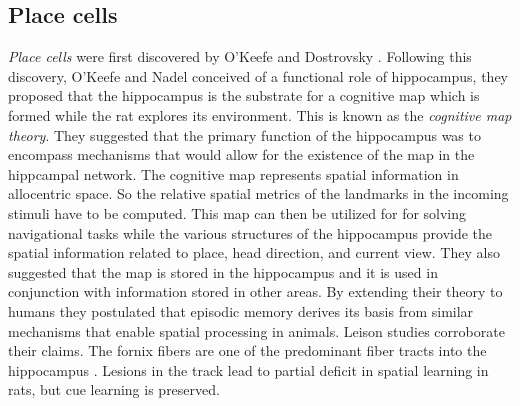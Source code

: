 \subsection{Place cells}
\label{placeCells}
 \emph{Place cells} were first discovered by O'Keefe and Dostrovsky \cite{O'Keefe1971a}. Following this discovery, O'Keefe and Nadel \cite{Street}  conceived of a functional role of hippocampus, they proposed that the hippocampus is the substrate for a cognitive map which is formed while the rat explores its environment. This is known as the \emph{cognitive map theory}. They suggested that the primary function of the hippocampus was to encompass mechanisms that would allow for the existence of the map in the hippcampal network. The cognitive map represents spatial information in allocentric space. So the relative spatial metrics of the landmarks in the incoming stimuli have to be computed. This map can then be utilized for for solving navigational tasks while the various structures of the hippocampus provide the spatial information related to place, head direction, and current view. They also suggested that the map is stored in the hippocampus and it is used in conjunction with information stored in other areas. By extending their theory to humans they postulated that episodic memory derives its basis from similar mechanisms that enable spatial processing in animals. Leison studies corroborate their claims. The fornix fibers are one of the predominant fiber tracts into the hippocampus . Lesions in the track lead to partial deficit in spatial learning in rats, but cue learning is preserved.   \\

